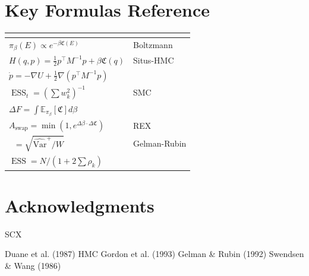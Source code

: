 \documentclass[12pt,a4paper]{article}
\theoremstyle{plain}
\theoremstyle{definition}
\newcommand{\E}{\mathbb{E}}
\newcommand{\Var}{\mathrm{Var}}
\newcommand{\Cercis}{\mathfrak{C}}
\DeclareMathOperator{\ESS}{ESS}
\DeclareMathOperator{\Rhat}{\hat{R}}
\begin{document}
\newpage


\section{}
\section*{Key Formulas Reference}

\begin{center}
\begin{tabular}{ll}
\toprule
\textbf{} & \textbf{} \\
\midrule
$\pi_\beta(E) \propto e^{-\beta \Cercis(E)}$ & Boltzmann  \\
$H(q,p) = \frac{1}{2}p^\top M^{-1}p + \beta\Cercis(q)$ & Situs-HMC  \\
$\dot{p} = -\nabla U + \frac{1}{2}\nabla(p^\top M^{-1}p)$ &  \\
$\ESS_t = (\sum w_k^2)^{-1}$ & SMC  \\
$\Delta F = \int \E_{\pi_\beta}[\Cercis] d\beta$ &  \\
$A_{\text{swap}} = \min(1, e^{\Delta\beta \cdot \Delta\Cercis})$ & REX  \\
$\Rhat = \sqrt{\widehat{\Var}^+ / W}$ & Gelman-Rubin  \\
$\ESS = N/(1 + 2\sum \rho_k)$ &  \\
\bottomrule
\end{tabular}
\end{center}

\newpage


\section*{ Acknowledgments}

 SCX 

 Duane et al. (1987)  HMC 
Gordon et al. (1993) Gelman \& Rubin (1992) 
 Swendsen \& Wang (1986) 
\end{document}
